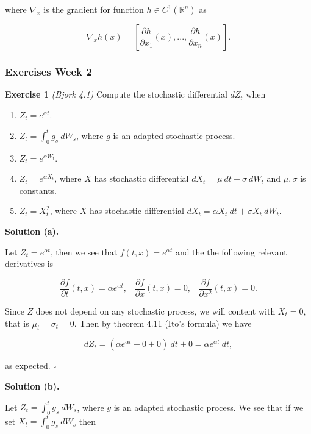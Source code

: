\documentclass[
]{article}
\providecommand{\tightlist}{%
  \setlength{\itemsep}{0pt}\setlength{\parskip}{0pt}}
\begin{document}
where \(\nabla_x\) is the gradient for function
\(h\in C^1(\mathbb{R}^n)\) as

\[
\nabla_xh(x)=\left[\frac{\partial h}{\partial x_1}(x),...,\frac{\partial h}{\partial x_n}(x)\right].
\]

\hypertarget{exercises-week-2}{%
\subsubsection{Exercises Week 2}\label{exercises-week-2}}

\textbf{Exercise 1} \emph{(Bjork 4.1)} Compute the stochastic
differential \(dZ_t\) when

\begin{enumerate}
\def\labelenumi{\alph{enumi}.}
\tightlist
\item
  \(Z_t=e^{\alpha t}\).
\item
  \(Z_t=\int_0^t g_s\ dW_s\), where \(g\) is an adapted stochastic
  process.
\item
  \(Z_t=e^{\alpha W_t}\).
\item
  \(Z_t=e^{\alpha X_t}\), where \(X\) has stochastic differential
  \(dX_t=\mu\ dt + \sigma\ dW_t\) and \(\mu,\sigma\) is constants.
\item
  \(Z_t=X_t^2\), where \(X\) has stochastic differential
  \(dX_t=\alpha X_t\ dt+\sigma X_t\ dW_t\).
\end{enumerate}

\textbf{Solution (a).}

Let \(Z_t=e^{\alpha t}\), then we see that \(f(t,x)=e^{\alpha t}\) and
the the following relevant derivatives is

\[
\frac{\partial f}{\partial t}(t,x)=\alpha e^{\alpha t},\hspace{10pt}\frac{\partial f}{\partial x}(t,x) =0,\hspace{10pt}\frac{\partial f}{\partial x^2}(t,x) =0.
\]

Since \(Z\) does not depend on any stochastic process, we will content
with \(X_t=0\), that is \(\mu_t=\sigma_t=0\). Then by theorem 4.11
(Ito's formula) we have

\[
dZ_t=\left(\alpha e^{\alpha t} +0+0\right)\ dt + 0=\alpha e^{\alpha t}\ dt,
\]

as expected. \(\square\)

\textbf{Solution (b).}

Let \(Z_t=\int_0^t g_s\ dW_s\), where \(g\) is an adapted stochastic
process. We see that if we set \(X_t=\int_0^t g_s\ dW_s\) then
\end{document}
